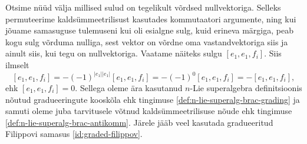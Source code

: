 Otsime nüüd välja millised sulud on tegelikult võrdsed nullvektoriga. Selleks
permuteerime kaldsümmeetrilisust kasutades kommutaatori argumente, ning kui
jõuame samasuguse tulemuseni kui oli esialgne sulg, kuid erineva märgiga,
peab kogu sulg võrduma nulliga, sest vektor on võrdne oma vastandvektoriga
siis ja ainult siis, kui tegu on nullvektoriga. Vaatame näiteks sulgu
$[e_1, e_1, f_i]$. Siis ilmselt
\[
    [e_1, e_1, f_i] = -(-1)^{|e_1||e_1|} [e_1, e_1, f_i] =
    -(-1)^0 [e_1, e_1, f_i] = - [e_1, e_1, f_i],
\]
ehk $[e_1, e_1, f_i] = 0$.
Sellega oleme ära kasutanud $n$-Lie superalgebra definitsioonis nõutud
gradueeringute kooskõla ehk tingimuse \eqref{def:n-lie-superalg-brac-grading}
ja samuti oleme juba tarvitusele võtnud kaldsümmeetrilisuse nõude ehk
tingimuse \eqref{def:n-lie-superalg-brac-antikomm}. Järele jääb veel kasutada
gradueeritud Filippovi samasus \eqref{id:graded-filippov}.
